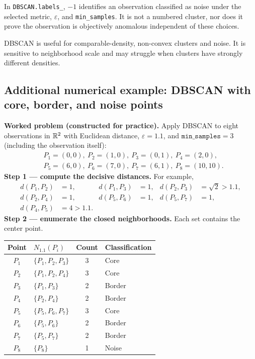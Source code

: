 In \texttt{DBSCAN.labels\_}, $-1$ identifies an observation classified as noise under the selected metric, $\varepsilon$, and \texttt{min\_samples}. It is not a numbered cluster, nor does it prove the observation is objectively anomalous independent of these choices.
\begin{answer}
DBSCAN is useful for comparable-density, non-convex clusters and noise. It is sensitive to neighborhood scale and may struggle when clusters have strongly different densities.
\end{answer}

\subsection*{Additional numerical example: DBSCAN with core, border, and noise points}
\textbf{Worked problem (constructed for practice).} Apply DBSCAN to eight observations in $\mathbb R^2$ with Euclidean distance, $\varepsilon=1.1$, and $\texttt{min\_samples}=3$ (including the observation itself):
\[
\begin{aligned}
&P_1=(0,0),\ P_2=(1,0),\ P_3=(0,1),\ P_4=(2,0),\\
&P_5=(6,0),\ P_6=(7,0),\ P_7=(6,1),\ P_8=(10,10).
\end{aligned}
\]
\textbf{Step 1 --- compute the decisive distances.} For example,
\[
\begin{aligned}
d(P_1,P_2)&=1, & d(P_1,P_3)&=1, & d(P_2,P_3)&=\sqrt2>1.1,\\
d(P_2,P_4)&=1, & d(P_5,P_6)&=1, & d(P_5,P_7)&=1,\\
d(P_4,P_5)&=4>1.1. &&&&
\end{aligned}
\]
\textbf{Step 2 --- enumerate the closed neighborhoods.} Each set contains the center point.
\begin{center}\small
\begin{tabular}{@{}clcl@{}}\toprule
Point & $N_{1.1}(P_i)$ & Count & Classification\\\midrule
$P_1$ & $\{P_1,P_2,P_3\}$ & 3 & Core\\
$P_2$ & $\{P_1,P_2,P_4\}$ & 3 & Core\\
$P_3$ & $\{P_1,P_3\}$ & 2 & Border\\
$P_4$ & $\{P_2,P_4\}$ & 2 & Border\\
$P_5$ & $\{P_5,P_6,P_7\}$ & 3 & Core\\
$P_6$ & $\{P_5,P_6\}$ & 2 & Border\\
$P_7$ & $\{P_5,P_7\}$ & 2 & Border\\
$P_8$ & $\{P_8\}$ & 1 & Noise\\\bottomrule
\end{tabular}
\end{center}
